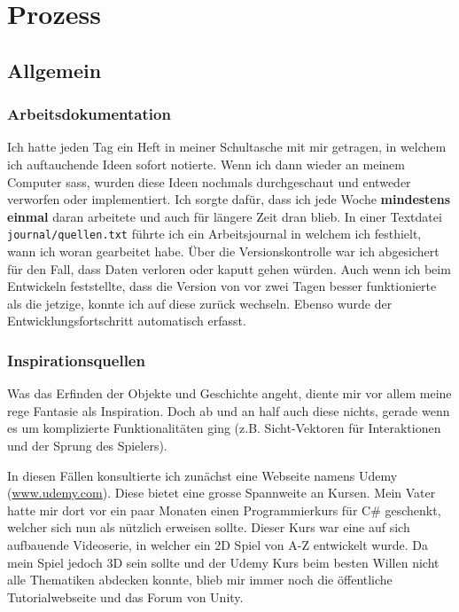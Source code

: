 \chapter{Prozess}

\section{Allgemein}

\subsection{Arbeitsdokumentation} 

Ich hatte jeden Tag ein Heft in meiner Schultasche mit mir getragen, in welchem ich auftauchende Ideen sofort notierte.
Wenn ich dann wieder an meinem Computer sass, wurden diese Ideen nochmals durchgeschaut und entweder verworfen oder implementiert.
Ich sorgte dafür, dass ich jede Woche \textbf{mindestens einmal} daran arbeitete und auch für längere Zeit dran blieb.
In einer Textdatei \lstinline{journal/quellen.txt} führte ich ein Arbeitsjournal in welchem ich festhielt, wann ich woran gearbeitet habe.
Über die Versionskontrolle war ich abgesichert für den Fall, dass Daten verloren oder kaputt gehen würden. Auch wenn ich beim Entwickeln feststellte, dass die Version von vor zwei Tagen besser funktionierte als die jetzige, konnte ich auf diese zurück wechseln.
Ebenso wurde der Entwicklungsfortschritt automatisch erfasst.

\subsection{Inspirationsquellen}
Was das Erfinden der Objekte und Geschichte angeht, diente mir vor allem meine rege Fantasie als Inspiration.
Doch ab und an half auch diese nichts, gerade wenn es um komplizierte Funktionalitäten ging (z.B. Sicht-Vektoren für Interaktionen und der Sprung des Spielers).

In diesen Fällen konsultierte ich zunächst eine Webseite namens Udemy (\url{www.udemy.com}). Diese bietet eine grosse Spannweite an Kursen. Mein Vater hatte mir dort vor ein paar Monaten einen Programmierkurs für C\# geschenkt, welcher sich nun als nützlich erweisen sollte.
Dieser Kurs war eine auf sich aufbauende Videoserie, in welcher ein 2D Spiel von A-Z entwickelt wurde.
Da mein Spiel jedoch 3D sein sollte und der Udemy Kurs beim besten Willen nicht alle Thematiken abdecken konnte, blieb mir immer noch die öffentliche Tutorialwebseite und das Forum von Unity. 


